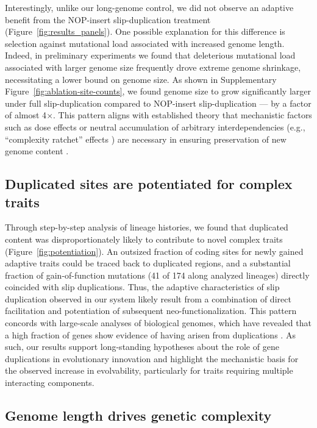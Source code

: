 Interestingly, unlike our long-genome control, we did not observe an adaptive benefit from the NOP-insert slip-duplication treatment (Figure~\ref{fig:results_panels}).
One possible explanation for this difference is selection against mutational load associated with increased genome length.
Indeed, in preliminary experiments we found that deleterious mutational load associated with larger genome size frequently drove extreme genome shrinkage, necessitating a lower bound on genome size.
As shown in Supplementary Figure~\ref{fig:ablation-site-counts}, we found genome size to grow significantly larger under full slip-duplication compared to NOP-insert slip-duplication --- by a factor of almost 4$\times$.
This pattern aligns with established theory that mechanistic factors such as dose effects or neutral accumulation of arbitrary interdependencies (e.g., ``complexity ratchet'' effects \citep{Liard2020,Soyer2006,Luke2011,gould1996full}) are necessary in ensuring preservation of new genome content \citep{Innan2010,Wagner1998,Tautz1992,Force1999,Bergthorsson2007}.

\subsection{Duplicated sites are potentiated for complex traits}

Through step-by-step analysis of lineage histories, we found that duplicated content was disproportionately likely to contribute to novel complex traits (Figure~\ref{fig:potentiation}).
An outsized fraction of coding sites for newly gained adaptive traits could be traced back to duplicated regions, and a substantial fraction of gain-of-function mutations (41 of 174 along analyzed lineages) directly coincided with slip duplications.
Thus, the adaptive characteristics of slip duplication observed in our system likely result from a combination of direct facilitation and potentiation of subsequent neo-functionalization.
This pattern concords with large-scale analyses of biological genomes, which have  revealed that a high fraction of genes show evidence of having arisen from duplications \citep{teichmann_structural_1998,Teichmann:2004cz}.
As such, our results support long-standing hypotheses about the role of gene duplications in evolutionary innovation and highlight the mechanistic basis for the observed increase in evolvability, particularly for traits requiring multiple interacting components.

\subsection{Genome length drives genetic complexity}

